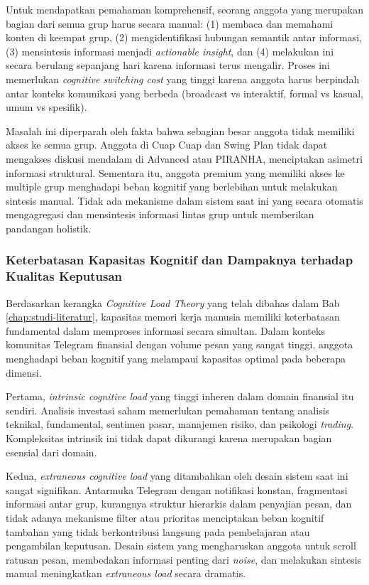 Untuk mendapatkan pemahaman komprehensif, seorang anggota yang merupakan bagian dari semua grup harus secara manual: (1) membaca dan memahami konten di keempat grup, (2) mengidentifikasi hubungan semantik antar informasi, (3) mensintesis informasi menjadi \textit{actionable insight}, dan (4) melakukan ini secara berulang sepanjang hari karena informasi terus mengalir. Proses ini memerlukan \textit{cognitive switching cost} yang tinggi karena anggota harus berpindah antar konteks komunikasi yang berbeda (broadcast vs interaktif, formal vs kasual, umum vs spesifik).

Masalah ini diperparah oleh fakta bahwa sebagian besar anggota tidak memiliki akses ke semua grup. Anggota di Cuap Cuap dan Swing Plan tidak dapat mengakses diskusi mendalam di Advanced atau PIRANHA, menciptakan asimetri informasi struktural. Sementara itu, anggota premium yang memiliki akses ke multiple grup menghadapi beban kognitif yang berlebihan untuk melakukan sintesis manual. Tidak ada mekanisme dalam sistem saat ini yang secara otomatis mengagregasi dan mensintesis informasi lintas grup untuk memberikan pandangan holistik.

\subsubsection{Keterbatasan Kapasitas Kognitif dan Dampaknya terhadap Kualitas Keputusan}

Berdasarkan kerangka \textit{Cognitive Load Theory} yang telah dibahas dalam Bab \ref{chap:studi-literatur}, kapasitas memori kerja manusia memiliki keterbatasan fundamental dalam memproses informasi secara simultan. Dalam konteks komunitas Telegram finansial dengan volume pesan yang sangat tinggi, anggota menghadapi beban kognitif yang melampaui kapasitas optimal pada beberapa dimensi.

Pertama, \textit{intrinsic cognitive load} yang tinggi inheren dalam domain finansial itu sendiri. Analisis investasi saham memerlukan pemahaman tentang analisis teknikal, fundamental, sentimen pasar, manajemen risiko, dan psikologi \textit{trading}. Kompleksitas intrinsik ini tidak dapat dikurangi karena merupakan bagian esensial dari domain.

Kedua, \textit{extraneous cognitive load} yang ditambahkan oleh desain sistem saat ini sangat signifikan. Antarmuka Telegram dengan notifikasi konstan, fragmentasi informasi antar grup, kurangnya struktur hierarkis dalam penyajian pesan, dan tidak adanya mekanisme filter atau prioritas menciptakan beban kognitif tambahan yang tidak berkontribusi langsung pada pembelajaran atau pengambilan keputusan. Desain sistem yang mengharuskan anggota untuk scroll ratusan pesan, membedakan informasi penting dari \textit{noise}, dan melakukan sintesis manual meningkatkan \textit{extraneous load} secara dramatis.

